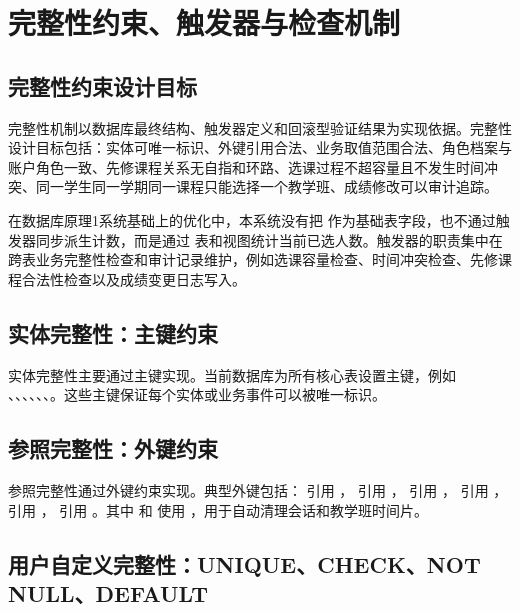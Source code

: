 \chapter{完整性约束、触发器与检查机制}

\section{完整性约束设计目标}

完整性机制以数据库最终结构、触发器定义和回滚型验证结果为实现依据。完整性设计目标包括：实体可唯一标识、外键引用合法、业务取值范围合法、角色档案与账户角色一致、先修课程关系无自指和环路、选课过程不超容量且不发生时间冲突、同一学生同一学期同一课程只能选择一个教学班、成绩修改可以审计追踪。

在数据库原理1系统基础上的优化中，本系统没有把  作为基础表字段，也不通过触发器同步派生计数，而是通过  表和视图统计当前已选人数。触发器的职责集中在跨表业务完整性检查和审计记录维护，例如选课容量检查、时间冲突检查、先修课程合法性检查以及成绩变更日志写入。

\section{实体完整性：主键约束}

实体完整性主要通过主键实现。当前数据库为所有核心表设置主键，例如 、、、、、、。这些主键保证每个实体或业务事件可以被唯一标识。

\section{参照完整性：外键约束}

参照完整性通过外键约束实现。典型外键包括： 引用 ， 引用 ， 引用 ， 引用 ， 引用 ， 引用 。其中  和  使用 ，用于自动清理会话和教学班时间片。

\section{用户自定义完整性：UNIQUE、CHECK、NOT NULL、DEFAULT}

